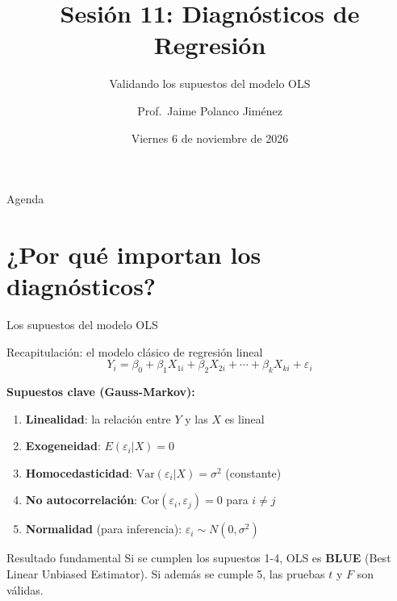 \documentclass[aspectratio=169, 11pt]{beamer}
\title{Sesión 11: Diagnósticos de Regresión}
\subtitle{Validando los supuestos del modelo OLS}
\author{Prof.\ Jaime Polanco Jim\'enez}
\date{Viernes 6 de noviembre de 2026}
\begin{document}
\begin{frame}
\titlepage
\end{frame}

\begin{frame}{Agenda}
\tableofcontents
\end{frame}

\section{¿Por qué importan los diagnósticos?}

\begin{frame}{Los supuestos del modelo OLS}
\begin{block}{Recapitulación: el modelo clásico de regresión lineal}
$$Y_i = \beta_0 + \beta_1 X_{1i} + \beta_2 X_{2i} + \cdots + \beta_k X_{ki} + \varepsilon_i$$
\end{block}

\textbf{Supuestos clave (Gauss-Markov):}
\begin{enumerate}
\item \textbf{Linealidad}: la relación entre $Y$ y las $X$ es lineal
\item \textbf{Exogeneidad}: $E(\varepsilon_i | X) = 0$
\item \textbf{Homocedasticidad}: $\text{Var}(\varepsilon_i | X) = \sigma^2$ (constante)
\item \textbf{No autocorrelación}: $\text{Cor}(\varepsilon_i, \varepsilon_j) = 0$ para $i \neq j$
\item \textbf{Normalidad} (para inferencia): $\varepsilon_i \sim N(0, \sigma^2)$
\end{enumerate}

\vspace{0.3cm}
\begin{alertblock}{Resultado fundamental}
Si se cumplen los supuestos 1-4, OLS es \textbf{BLUE} (Best Linear Unbiased Estimator).
Si además se cumple 5, las pruebas $t$ y $F$ son válidas.
\end{alertblock}
\end{frame}
\end{document}
